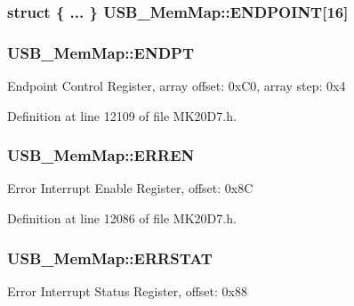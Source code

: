 \subsubsection[{\texorpdfstring{E\+N\+D\+P\+O\+I\+NT}{ENDPOINT}}]{\setlength{\rightskip}{0pt plus 5cm}struct \{ ... \}   U\+S\+B\+\_\+\+Mem\+Map\+::\+E\+N\+D\+P\+O\+I\+NT\mbox{[}16\mbox{]}}\hypertarget{struct_u_s_b___mem_map_a13975b0cab8f0b16d8f906892722dfa7}{}\label{struct_u_s_b___mem_map_a13975b0cab8f0b16d8f906892722dfa7}
\subsubsection[{\texorpdfstring{E\+N\+D\+PT}{ENDPT}}]{ U\+S\+B\+\_\+\+Mem\+Map\+::\+E\+N\+D\+PT}\hypertarget{struct_u_s_b___mem_map_a86aaba02227a45a333f72565b0bec378}{}\label{struct_u_s_b___mem_map_a86aaba02227a45a333f72565b0bec378}
Endpoint Control Register, array offset\+: 0x\+C0, array step\+: 0x4 

Definition at line 12109 of file M\+K20\+D7.\+h.

\subsubsection[{\texorpdfstring{E\+R\+R\+EN}{ERREN}}]{ U\+S\+B\+\_\+\+Mem\+Map\+::\+E\+R\+R\+EN}\hypertarget{struct_u_s_b___mem_map_a810f265a9ad6dc0f51834d0cecf24a79}{}\label{struct_u_s_b___mem_map_a810f265a9ad6dc0f51834d0cecf24a79}
Error Interrupt Enable Register, offset\+: 0x8C 

Definition at line 12086 of file M\+K20\+D7.\+h.

\subsubsection[{\texorpdfstring{E\+R\+R\+S\+T\+AT}{ERRSTAT}}]{ U\+S\+B\+\_\+\+Mem\+Map\+::\+E\+R\+R\+S\+T\+AT}\hypertarget{struct_u_s_b___mem_map_ad86f18ee95df11168d4b6cf68578e0fa}{}\label{struct_u_s_b___mem_map_ad86f18ee95df11168d4b6cf68578e0fa}
Error Interrupt Status Register, offset\+: 0x88 

